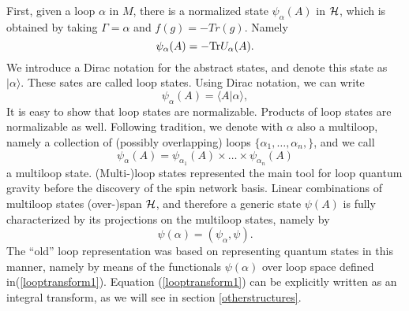 First, given a loop $\alpha$ in $M$, there is a normalized state 
$\psi_{\alpha}(A)$ in $\cal H$, which is obtained by taking 
$\Gamma=\alpha$ and $f(g)=-Tr(g)$.  Namely
\begin{equation}
	\psi_{\alpha}(A) = - {\rm Tr} U_{\alpha}(A). 
\end{equation}
We introduce a Dirac notation for the abstract states, and 
denote this state as $|\alpha\rangle$.  These sates are called 
loop states. Using Dirac notation, we can write
\begin{equation}
	\psi_{\alpha}(A) = \langle A |\alpha\rangle,
\end{equation}
It is easy to show that loop states are normalizable.  Products 
of loop states are normalizable as well.  Following tradition, we 
denote with $\alpha$ also a multiloop, namely a collection of 
(possibly overlapping) loops $\{\alpha_{1},\ldots,\alpha_{n},\}$, 
and we call 
\begin{equation}
	\psi_{\alpha}(A)=\psi_{\alpha_{1}}(A)\times \ldots \times 	
	\psi_{\alpha_{n}}(A)
\end{equation}
a multiloop state.  (Multi-)loop states represented the main tool 
for loop quantum gravity before the discovery of the spin network 
basis.  Linear combinations of multiloop states (over-)span $\cal 
H$, and therefore a generic state $\psi(A)$ is fully 
characterized by its projections on the multiloop states, namely 
by
\begin{equation}
	\psi(\alpha) = (\psi_{\alpha},\psi).
	\label{looptransform1}
\end{equation}
The ``old'' loop representation was based on representing quantum 
states in this manner, namely by means of the functionals 
$\psi(\alpha)$ over loop space defined in(\ref{looptransform1}).  
Equation (\ref{looptransform1}) can be explicitly written as an 
integral transform, as we will see in section \ref{otherstructures}. 

